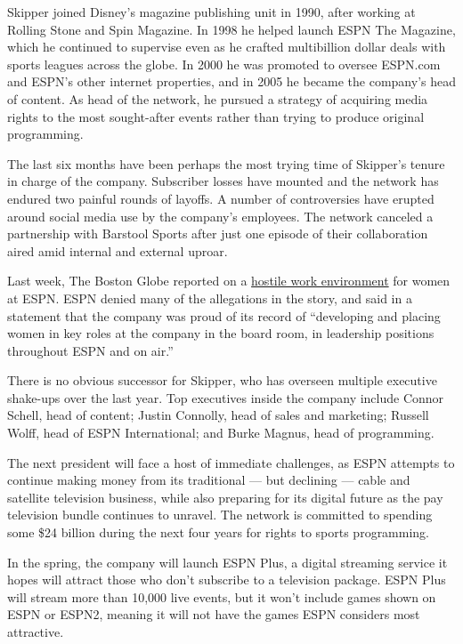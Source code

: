 Skipper joined Disney's magazine publishing unit in 1990, after working
at Rolling Stone and Spin Magazine. In 1998 he helped launch ESPN The
Magazine, which he continued to supervise even as he crafted
multibillion dollar deals with sports leagues across the globe. In 2000
he was promoted to oversee ESPN.com and ESPN's other internet
properties, and in 2005 he became the company's head of content. As head
of the network, he pursued a strategy of acquiring media rights to the
most sought-after events rather than trying to produce original
programming.

The last six months have been perhaps the most trying time of Skipper's
tenure in charge of the company. Subscriber losses have mounted and the
network has endured two painful rounds of layoffs. A number of
controversies have erupted around social media use by the company's
employees. The network canceled a partnership with Barstool Sports after
just one episode of their collaboration aired amid internal and external
uproar.

Last week, The Boston Globe reported on a
\href{https://www.bostonglobe.com/sports/2017/12/14/women-who-worked-espn-say-its-problems-far-beyond-barstool-sports/L1v9HJIvtnHuBPiMru6yGM/story.html}{hostile
work environment} for women at ESPN. ESPN denied many of the allegations
in the story, and said in a statement that the company was proud of its
record of ``developing and placing women in key roles at the company in
the board room, in leadership positions throughout ESPN and on air.''

There is no obvious successor for Skipper, who has overseen multiple
executive shake-ups over the last year. Top executives inside the
company include Connor Schell, head of content; Justin Connolly, head of
sales and marketing; Russell Wolff, head of ESPN International; and
Burke Magnus, head of programming.

The next president will face a host of immediate challenges, as ESPN
attempts to continue making money from its traditional --- but declining
--- cable and satellite television business, while also preparing for
its digital future as the pay television bundle continues to unravel.
The network is committed to spending some \$24 billion during the next
four years for rights to sports programming.

In the spring, the company will launch ESPN Plus, a digital streaming
service it hopes will attract those who don't subscribe to a television
package. ESPN Plus will stream more than 10,000 live events, but it
won't include games shown on ESPN or ESPN2, meaning it will not have the
games ESPN considers most attractive.


